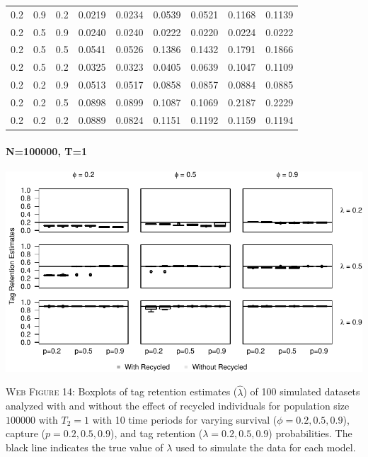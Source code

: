 \documentclass[]{article}
\let\oldparagraph\paragraph
\renewcommand{\paragraph}[1]{\oldparagraph{#1}\mbox{}}
\begin{document}
\begin{table}[ht]
{\begin{tabular}{rrrrrrrrr}
  0.2 & 0.9 & 0.2 & 0.0219 & 0.0234 & 0.0539 & 0.0521 & 0.1168 & 0.1139 \\ 
  0.2 & 0.5 & 0.9 & 0.0240 & 0.0240 & 0.0222 & 0.0220 & 0.0224 & 0.0222 \\ 
  0.2 & 0.5 & 0.5 & 0.0541 & 0.0526 & 0.1386 & 0.1432 & 0.1791 & 0.1866 \\ 
  0.2 & 0.5 & 0.2 & 0.0325 & 0.0323 & 0.0405 & 0.0639 & 0.1047 & 0.1109 \\ 
  0.2 & 0.2 & 0.9 & 0.0513 & 0.0517 & 0.0858 & 0.0857 & 0.0884 & 0.0885 \\ 
  0.2 & 0.2 & 0.5 & 0.0898 & 0.0899 & 0.1087 & 0.1069 & 0.2187 & 0.2229 \\ 
  0.2 & 0.2 & 0.2 & 0.0889 & 0.0824 & 0.1151 & 0.1192 & 0.1159 & 0.1194 \\ 
   \hline
\end{tabular}
}
\endgroup
\end{table}

\newpage

\paragraph{N=100000, T=1}\label{n100000-t1-2}

\includegraphics{Appendix_BW_files/figure-latex/figure14_tagretention_GJSTL2-1.pdf}

\textsc{Web Figure 14:} Boxplots of tag retention estimates
(\(\hat{\lambda}\)) of 100 simulated datasets analyzed with and without
the effect of recycled individuals for population size \(100000\) with
\(T_2=1\) with 10 time periods for varying survival
(\(\phi=0.2,0.5,0.9\)), capture (\(p=0.2,0.5,0.9\)), and tag retention
(\(\lambda=0.2,0.5,0.9\)) probabilities. The black line indicates the
true value of \(\lambda\) used to simulate the data for each model.
\end{document}
